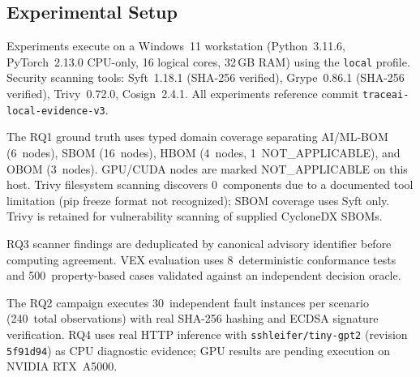 \subsection{Experimental Setup}

Experiments execute on a Windows~11 workstation (Python~3.11.6, PyTorch~2.13.0 CPU-only, 16 logical cores, 32\,GB RAM) using the \texttt{local} profile. Security scanning tools: Syft~1.18.1 (SHA-256 verified), Grype~0.86.1 (SHA-256 verified), Trivy~0.72.0, Cosign~2.4.1. All experiments reference commit \texttt{traceai-local-evidence-v3}.

The RQ1 ground truth uses typed domain coverage separating AI/ML-BOM (6~nodes), SBOM (16~nodes), HBOM (4~nodes, 1~NOT\_APPLICABLE), and OBOM (3~nodes). GPU/CUDA nodes are marked NOT\_APPLICABLE on this host. Trivy filesystem scanning discovers 0~components due to a documented tool limitation (pip freeze format not recognized); SBOM coverage uses Syft only. Trivy is retained for vulnerability scanning of supplied CycloneDX SBOMs.

RQ3 scanner findings are deduplicated by canonical advisory identifier before computing agreement. VEX evaluation uses 8~deterministic conformance tests and 500~property-based cases validated against an independent decision oracle.

The RQ2 campaign executes 30~independent fault instances per scenario (240~total observations) with real SHA-256 hashing and ECDSA signature verification. RQ4 uses real HTTP inference with \texttt{sshleifer/tiny-gpt2} (revision \texttt{5f91d94}) as CPU diagnostic evidence; GPU results are pending execution on NVIDIA RTX~A5000.